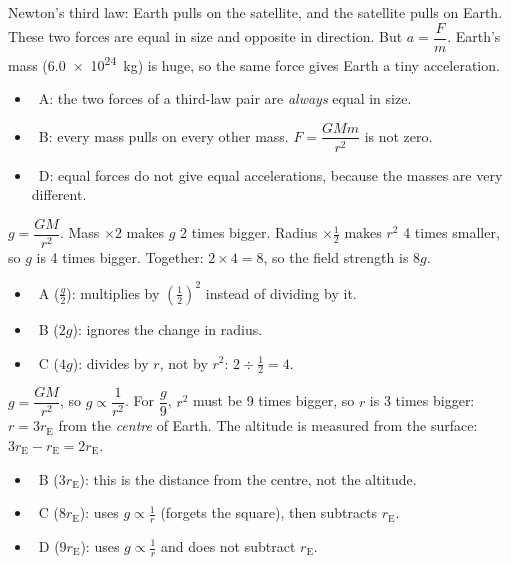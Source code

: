 \documentclass[12pt]{article}
\begin{document}
\begin{practiceanswers}

\begin{practiceans}
  Newton's third law: Earth pulls on the satellite, and the satellite pulls on Earth. These two
  forces are equal in size and opposite in direction. But $a = \dfrac{F}{m}$. Earth's mass
  (\qty{6.0e24}{kg}) is huge, so the same force gives Earth a tiny acceleration.
  \begin{itemize}
    \item \xmark\ A: the two forces of a third-law pair are \emph{always} equal in size.
    \item \xmark\ B: every mass pulls on every other mass. $F = \dfrac{GMm}{r^2}$ is not zero.
    \item \xmark\ D: equal forces do not give equal accelerations, because the masses are very
          different.
  \end{itemize}
\end{practiceans}

\begin{practiceans}
  $g = \dfrac{GM}{r^2}$. Mass $\times 2$ makes $g$ 2 times bigger. Radius $\times \frac{1}{2}$
  makes $r^2$ 4 times smaller, so $g$ is 4 times bigger. Together: $2 \times 4 = 8$, so the field
  strength is $8g$.
  \begin{itemize}
    \item \xmark\ A ($\frac{g}{2}$): multiplies by $\left(\frac{1}{2}\right)^2$ instead of dividing by it.
    \item \xmark\ B ($2g$): ignores the change in radius.
    \item \xmark\ C ($4g$): divides by $r$, not by $r^2$: $2 \div \frac{1}{2} = 4$.
  \end{itemize}
\end{practiceans}

\begin{practiceans}
  $g = \dfrac{GM}{r^2}$, so $g \propto \dfrac{1}{r^2}$. For $\dfrac{g}{9}$, $r^2$ must be 9 times
  bigger, so $r$ is 3 times bigger: $r = 3r_\mathrm{E}$ from the \emph{centre} of Earth. The
  altitude is measured from the surface: $3r_\mathrm{E} - r_\mathrm{E} = 2r_\mathrm{E}$.
  \begin{itemize}
    \item \xmark\ B ($3r_\mathrm{E}$): this is the distance from the centre, not the altitude.
    \item \xmark\ C ($8r_\mathrm{E}$): uses $g \propto \frac{1}{r}$ (forgets the square), then subtracts
          $r_\mathrm{E}$.
    \item \xmark\ D ($9r_\mathrm{E}$): uses $g \propto \frac{1}{r}$ and does not subtract $r_\mathrm{E}$.
  \end{itemize}
\end{practiceans}


\end{practiceanswers}
\end{document}
